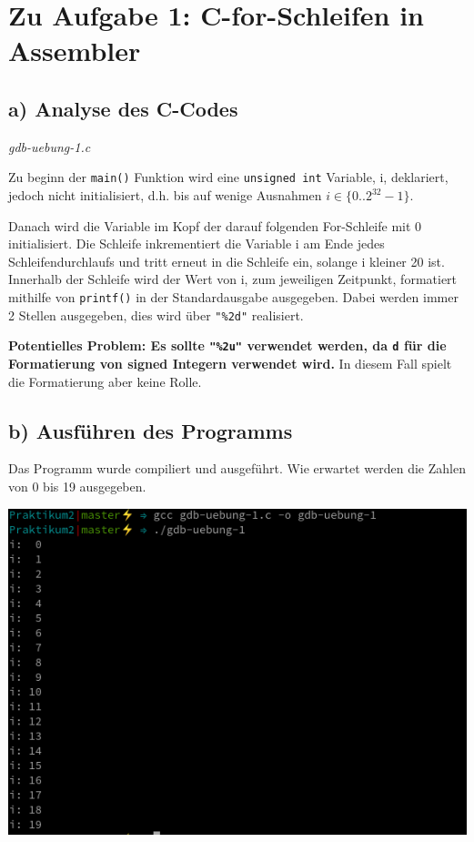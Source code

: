 \documentclass[12pt]{article}
\begin{document}
\section{Zu Aufgabe 1: C-for-Schleifen in Assembler}
\subsection{a) Analyse des C-Codes}

\textit{gdb-uebung-1.c}



Zu beginn der \texttt{main()} Funktion wird eine \texttt{unsigned int} Variable, i, deklariert, jedoch nicht initialisiert, d.h. bis auf wenige Ausnahmen $i \in \{0..2^{32}-1\}$.

Danach wird die Variable im Kopf der darauf folgenden For-Schleife mit 0 initialisiert. Die Schleife inkrementiert die Variable i am Ende jedes Schleifendurchlaufs und tritt erneut in die Schleife ein, solange i kleiner 20 ist.
Innerhalb der Schleife wird der Wert von i, zum jeweiligen Zeitpunkt, formatiert mithilfe von \texttt{printf()} in der Standardausgabe ausgegeben. Dabei werden immer 2 Stellen ausgegeben, dies wird über \texttt{"\%2d"} realisiert.

\textbf{Potentielles Problem: Es sollte \texttt{"\%2u"} verwendet werden, da \texttt{d} für die Formatierung von signed Integern verwendet wird.} In diesem Fall spielt die Formatierung aber keine Rolle.

\subsection{b) Ausführen des Programms}
Das Programm wurde compiliert und ausgeführt. Wie erwartet werden die Zahlen von 0 bis 19 ausgegeben.

\begin{center}
   \includegraphics[scale=0.9]{Pictures/aufgabe1b.png}
\end{center}
\end{document}
